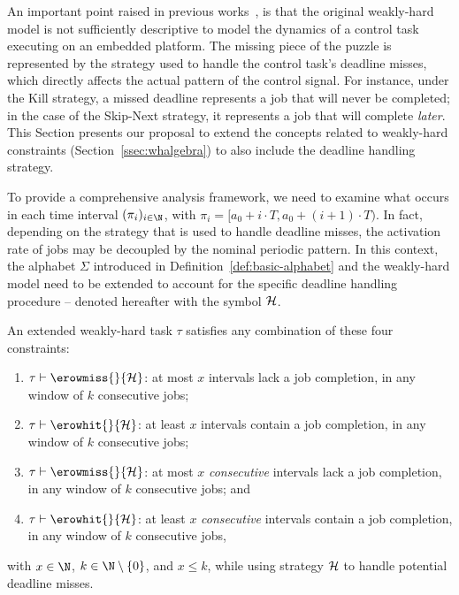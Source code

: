 An important point raised in previous works~\cite{Pazzaglia:2018, Pazzaglia:2019, Maggio:2020, Vreman:2021}, is that the original weakly-hard model is not sufficiently descriptive to model the dynamics of a control task executing on an embedded platform.
The missing piece of the puzzle is represented by the strategy used to handle the control task's deadline misses, which directly affects the actual pattern of the control signal.
For instance, under the Kill strategy, a missed deadline represents a job that will never be completed;
in the case of the Skip-Next strategy, it represents a job that will complete \emph{later}.
%
This Section presents our proposal to extend the concepts related to weakly-hard constraints (Section~\ref{ssec:whalgebra}) to also include the deadline handling strategy. 

To provide a comprehensive analysis framework, we need to examine what occurs in each time interval $(\pi_i)_{i \in \N}$, with $\pi_i = [a_0 + i\cdot T, a_0 + (i+1)\cdot T)$. 
In fact, depending on the strategy that is used to handle deadline misses, the activation rate of jobs may be decoupled by the nominal periodic pattern.
In this context, the alphabet $\Sigma$ introduced in Definition~\ref{def:basic-alphabet} and the weakly-hard model need to be extended to account for the specific deadline handling procedure -- denoted hereafter with the symbol $\mathcal{H}$.
%

\begin{definition}%
    \label{def:new-mk}%
    An extended weakly-hard task $\tau$ satisfies any combination of these four constraints:
    \begin{enumerate}[label=(\roman*)]
        \item $\tau \vdash \erowmiss{}{\strat}$: at most $x$ intervals lack a job completion, in any window of $k$ consecutive jobs;
        \item $\tau \vdash \erowhit{}{\strat}$: at least $x$ intervals contain a job completion, in any window of $k$ consecutive jobs;
        \item $\tau \vdash \erowmiss{}{\strat}$: at most $x$ \emph{consecutive} intervals lack a job completion, in any window of $k$ consecutive jobs; and
        \item $\tau \vdash \erowhit{}{\strat}$: at least $x$ \emph{consecutive} intervals contain a job completion, in any window of $k$ consecutive jobs,
    \end{enumerate}
    with $x\in \N$, $k \in \N\setminus \left\{ 0 \right\}$, and $x\leq k$, while using strategy $\mathcal{H}$ to handle potential deadline misses.
\end{definition}

